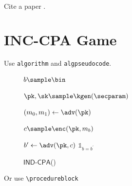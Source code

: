 





\maketitle

Cite a paper \cite{TCHES:CC24}.

\section{INC-CPA Game}

Use \texttt{algorithm} and \texttt{algpseudocode}.
\begin{figure}[h]
\centering

    \begin{minipage}{0.4\linewidth}
    \centering
    \begin{algorithm}[H]
    \caption{$\mathsf{IND\text{-}CPA}$(\adv)}
    \label{alg:ind-cpa}
    \begin{algorithmic}[1]
		\State $b \sample \bin$

        \State $\pk, \sk \sample \kgen(\secparam)$
        
        \State $(m_0, m_1) \gets \adv(\pk)$

        \State $c \sample \enc(\pk, m_b)$

        \State $b^\prime \gets \adv(\pk, c)$
        \State \Return $\mathds{1}_{b = b^\prime}$
    \end{algorithmic}
    \end{algorithm}
    \end{minipage}

\end{figure}

Or use \texttt{\textbackslash procedureblock}


